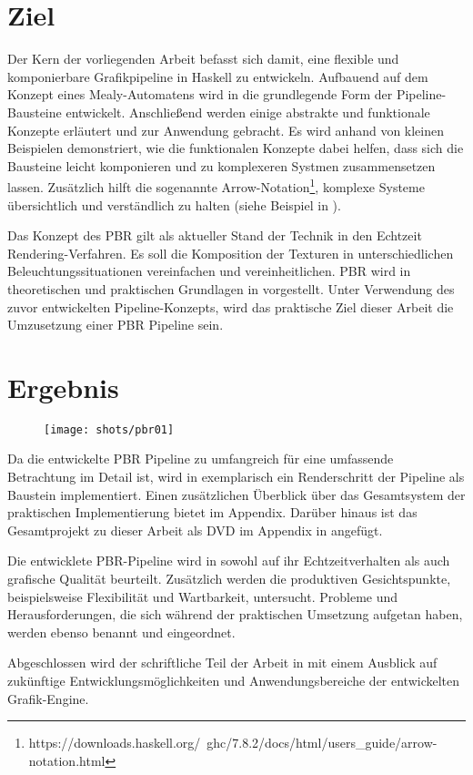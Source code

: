\section{Ziel}

Der Kern der vorliegenden Arbeit befasst sich damit, eine flexible und komponierbare Grafikpipeline in Haskell zu entwickeln. Aufbauend auf dem Konzept eines Mealy-Automatens wird in  die grundlegende Form der Pipeline-Bausteine entwickelt. Anschließend werden einige abstrakte und funktionale Konzepte erläutert und zur Anwendung gebracht. Es wird anhand von kleinen Beispielen demonstriert, wie die funktionalen Konzepte dabei helfen, dass sich die Bausteine leicht komponieren und zu komplexeren Systmen zusammensetzen lassen. Zusätzlich hilft die sogenannte Arrow-Notation\footnote{https://downloads.haskell.org/~ghc/7.8.2/docs/html/users\_guide/arrow-notation.html}, komplexe Systeme übersichtlich und verständlich zu halten (siehe Beispiel in ).

Das Konzept des \acl{PBR} gilt als aktueller Stand der Technik in den Echtzeit Rendering-Verfahren. Es soll die Komposition der Texturen in unterschiedlichen Beleuchtungssituationen vereinfachen und vereinheitlichen. \ac{PBR} wird in theoretischen und praktischen Grundlagen in  vorgestellt. Unter Verwendung des zuvor entwickelten Pipeline-Konzepts, wird das praktische Ziel dieser Arbeit die Umzusetzung einer \ac{PBR} Pipeline sein.

\section{Ergebnis}
\begin{figure}
\centering
	\texttt{[image: shots/pbr01]}
\end{figure}

Da die entwickelte \ac{PBR} Pipeline zu umfangreich für eine umfassende Betrachtung im Detail ist, wird in  exemplarisch ein Renderschritt der Pipeline als Baustein implementiert. Einen zusätzlichen Überblick über das Gesamtsystem der praktischen Implementierung bietet  im Appendix. Darüber hinaus ist das Gesamtprojekt zu dieser Arbeit als DVD im Appendix in  angefügt.

Die entwicklete \ac{PBR}-Pipeline wird in  sowohl auf ihr Echtzeitverhalten als auch grafische Qualität beurteilt. Zusätzlich werden die produktiven Gesichtspunkte, beispielsweise Flexibilität und Wartbarkeit, untersucht. Probleme und Herausforderungen, die sich während der praktischen Umsetzung aufgetan haben, werden ebenso benannt und eingeordnet.

Abgeschlossen wird der schriftliche Teil der Arbeit in  mit einem Ausblick auf zukünftige Entwicklungsmöglichkeiten und Anwendungsbereiche der entwickelten Grafik-Engine.

